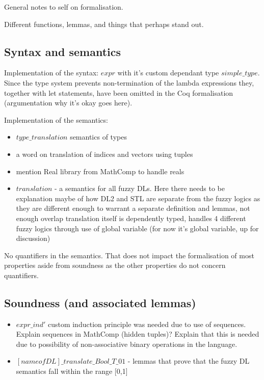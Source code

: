 \documentclass[a4paper,UKenglish,cleveref, autoref, thm-restate]{lipics-v2021}
\begin{document}
General notes to self on formalisation.

Different functions, lemmas, and things that perhaps stand out.

\subsection{Syntax and semantics}

Implementation of the syntax: $expr$ with it's custom dependant type $simple\_type$. Since the type system prevents non-termination of the lambda expressions they, together with let statements, have been omitted in the Coq formalisation (argumentation why it's okay goes here).



Implementation of the semantics: 
\begin{itemize}
	\item $type\_translation$ semantics of types
	\item a word on translation of indices and vectors using tuples
	\item mention Real library from MathComp to handle reals
	\item $translation$ - a semantics for all fuzzy DLs. Here there needs to be explanation maybe of how DL2 and STL are separate from the fuzzy logics as they are different enough to warrant a separate definition and lemmas, not enough overlap
	translation itself is dependently typed, handles 4 different fuzzy logics through use of global variable (for now it's global variable, up for discussion)
	
\end{itemize}

No quantifiers in the semantics. That does not impact the formalisation of most properties aside from soundness as the other properties do not concern quantifiers.

\subsection{Soundness (and associated lemmas)}

\begin{itemize}
	\item $expr\_ind'$ custom induction principle was needed due to use of sequences. Explain sequences in MathComp (hidden tuples)? Explain that this is needed due to possibility of non-associative binary operations in the language.
	\item $[name of DL]\_translate\_Bool\_T\_01$ - lemmas that prove that the fuzzy DL semantics fall within the range [0,1]
\end{itemize}
\end{document}
